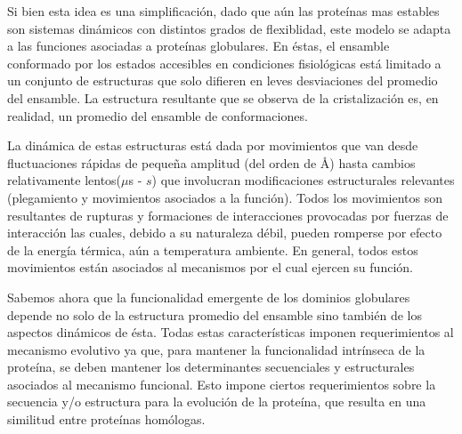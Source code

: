 Si bien esta idea es una simplificación, dado que aún las proteínas mas estables son sistemas dinámicos con distintos grados de flexiblidad, este modelo se adapta a las funciones asociadas a proteínas globulares.
En éstas, el ensamble conformado por los estados accesibles en condiciones fisiológicas está limitado a un conjunto de estructuras que solo difieren en leves desviaciones del promedio del ensamble.
La estructura resultante que se observa de la cristalización es, en realidad, un promedio del ensamble de conformaciones.

La dinámica de estas estructuras está dada por movimientos que van desde fluctuaciones rápidas de pequeña amplitud (del orden de \AA) hasta cambios relativamente lentos($\mu$s - $s$) que 
involucran modificaciones estructurales relevantes (plegamiento y movimientos asociados a la función).
Todos los movimientos son resultantes de rupturas y formaciones de interacciones provocadas por fuerzas de interacción las cuales, debido a su naturaleza débil, pueden romperse 
por efecto de la energía térmica, aún a temperatura ambiente. En general, todos estos movimientos están asociados al mecanismos por el cual ejercen su función.






Sabemos ahora que la funcionalidad emergente de los dominios globulares depende no solo de la estructura promedio del ensamble sino también de los aspectos dinámicos de ésta.
Todas estas características imponen requerimientos al mecanismo evolutivo ya que, para mantener la funcionalidad intrínseca de la proteína, se deben mantener los determinantes secuenciales y estructurales asociados al mecanismo funcional.
Esto impone ciertos requerimientos sobre la secuencia y/o estructura para la evolución de la proteína, que resulta en una similitud entre proteínas homólogas.


